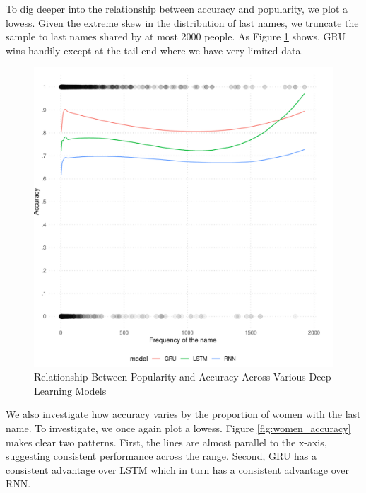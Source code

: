 \documentclass[11pt,  letterpaper]{article}
\begin{document}
To dig deeper into the relationship between accuracy and popularity, we plot a lowess. Given the extreme skew in the distribution of last names, we truncate the sample to last names shared by at most 2000 people. As Figure \ref{fig:popularity_accuracy} shows, GRU wins handily except at the tail end where we have very limited data.

\begin{figure}[!htb]

  \centering

    \caption{Relationship Between Popularity and Accuracy Across Various Deep Learning Models}

  \includegraphics[]{figs/popularity_perf.pdf}

  \label{fig:popularity_accuracy}

\end{figure}

We also investigate how accuracy varies by the proportion of women with the last name. To investigate, we once again plot a lowess. Figure \ref{fig:women_accuracy} makes clear two patterns. First, the lines are almost parallel to the x-axis, suggesting consistent performance across the range. Second, GRU has a consistent advantage over LSTM which in turn has a consistent advantage over RNN.
\end{document}

